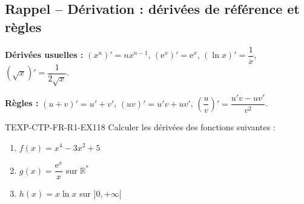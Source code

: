 

\subsection*{Rappel -- Dérivation : dérivées de référence et règles}

\textbf{Dérivées usuelles :} $(x^n)' = n x^{n-1}$, $(\mathrm{e}^x)' = \mathrm{e}^x$, $(\ln x)' = \dfrac{1}{x}$, $(\sqrt{x})' = \dfrac{1}{2\sqrt{x}}$.

\textbf{Règles :} $(u+v)' = u' + v'$, $(uv)' = u'v + uv'$, $\left(\dfrac{u}{v}\right)' = \dfrac{u'v - uv'}{v^2}$.

\begin{exercice}{TEXP-CTP-FR-R1-EX1}{1}{8}
Calculer les dérivées des fonctions suivantes :
\begin{enumerate}
  \item $f(x) = x^4 - 3x^2 + 5$
  \item $g(x) = \dfrac{\mathrm{e}^x}{x}$ sur $\mathbb{R}^*$
  \item $h(x) = x \ln x$ sur $]0, +\infty[$
\end{enumerate}
\end{exercice}

